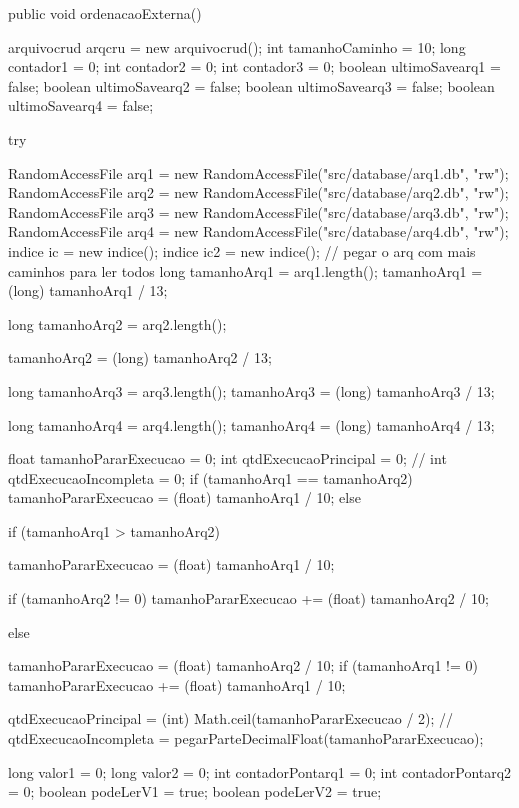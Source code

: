 public void ordenacaoExterna() {
    arquivocrud arqcru = new arquivocrud();
    int tamanhoCaminho = 10;
    long contador1 = 0;
    int contador2 = 0;
    int contador3 = 0;
    boolean ultimoSavearq1 = false;
    boolean ultimoSavearq2 = false;
    boolean ultimoSavearq3 = false;
    boolean ultimoSavearq4 = false;

    try {

      RandomAccessFile arq1 = new RandomAccessFile("src/database/arq1.db", "rw");
      RandomAccessFile arq2 = new RandomAccessFile("src/database/arq2.db", "rw");
      RandomAccessFile arq3 = new RandomAccessFile("src/database/arq3.db", "rw");
      RandomAccessFile arq4 = new RandomAccessFile("src/database/arq4.db", "rw");
      indice ic = new indice();
      indice ic2 = new indice();
      // pegar o arq com mais caminhos para ler todos
      long tamanhoArq1 = arq1.length();
      tamanhoArq1 = (long) tamanhoArq1 / 13;

      long tamanhoArq2 = arq2.length();

      tamanhoArq2 = (long) tamanhoArq2 / 13;

      long tamanhoArq3 = arq3.length();
      tamanhoArq3 = (long) tamanhoArq3 / 13;

      long tamanhoArq4 = arq4.length();
      tamanhoArq4 = (long) tamanhoArq4 / 13;

      float tamanhoPararExecucao = 0;
      int qtdExecucaoPrincipal = 0;
      // int qtdExecucaoIncompleta = 0;
      if (tamanhoArq1 == tamanhoArq2) {
        tamanhoPararExecucao = (float) tamanhoArq1 / 10;
      } else {
        if (tamanhoArq1 > tamanhoArq2) {
          tamanhoPararExecucao = (float) tamanhoArq1 / 10;

          if (tamanhoArq2 != 0) {
            tamanhoPararExecucao += (float) tamanhoArq2 / 10;
          }

        } else {
          tamanhoPararExecucao = (float) tamanhoArq2 / 10;
          if (tamanhoArq1 != 0) {
            tamanhoPararExecucao += (float) tamanhoArq1 / 10;
          }

        }
      }

      qtdExecucaoPrincipal = (int) Math.ceil(tamanhoPararExecucao / 2);
      // qtdExecucaoIncompleta = pegarParteDecimalFloat(tamanhoPararExecucao);

      long valor1 = 0;
      long valor2 = 0;
      int contadorPontarq1 = 0;
      int contadorPontarq2 = 0;
      boolean podeLerV1 = true;
      boolean podeLerV2 = true;

}}
